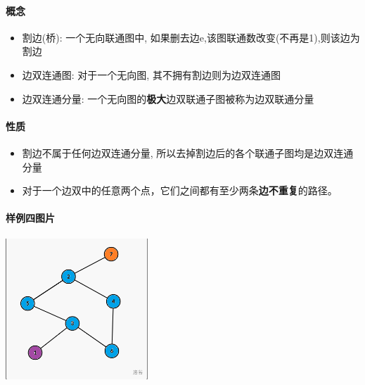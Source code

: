 \paragraph{概念}

\begin{itemize}
    \item 割边(桥): 一个无向联通图中, 如果删去边e,该图联通数改变(不再是1),则该边为割边
    \item 边双连通图: 对于一个无向图, 其不拥有割边则为边双连通图
    \item 边双连通分量: 一个无向图的\textbf{极大}边双联通子图被称为边双联通分量
\end{itemize}

\paragraph{性质}

\begin{itemize}
    \item 割边不属于任何边双连通分量, 所以去掉割边后的各个联通子图均是边双连通分量
    \item 对于一个边双中的任意两个点，它们之间都有至少两条\textbf{边不重复}的路径。
\end{itemize}

\paragraph{样例四图片}

\begin{center}
    \includegraphics[width=0.4\textwidth]{img/luogu-P8436-1.png}
\end{center}
